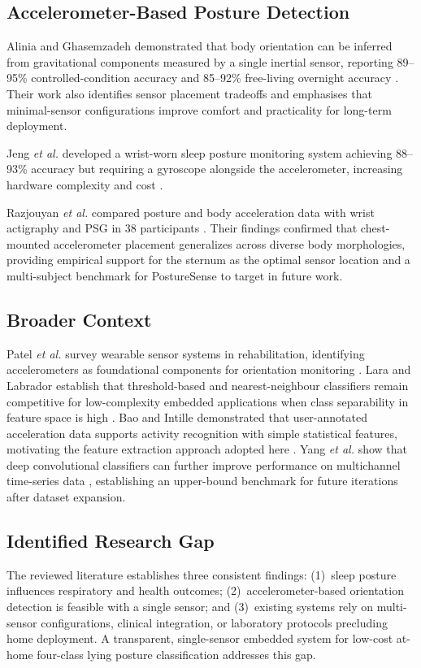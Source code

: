 \documentclass[journal]{IEEEtran}
\begin{document}
\subsection{Accelerometer-Based Posture Detection}
Alinia and Ghasemzadeh demonstrated that body orientation can be inferred
from gravitational components measured by a single inertial sensor,
reporting 89--95\% controlled-condition accuracy and 85--92\% free-living
overnight accuracy \cite{alinia2020}. Their work also identifies sensor
placement tradeoffs and emphasises that minimal-sensor configurations
improve comfort and practicality for long-term deployment.

Jeng \textit{et al.} developed a wrist-worn sleep posture monitoring system
achieving 88--93\% accuracy but requiring a gyroscope alongside the
accelerometer, increasing hardware complexity and cost \cite{jeng2021}.

Razjouyan \textit{et al.} compared posture and body acceleration data with
wrist actigraphy and PSG in 38 participants \cite{razjouyan2017}. Their
findings confirmed that chest-mounted accelerometer placement generalizes
across diverse body morphologies, providing empirical support for the
sternum as the optimal sensor location and a multi-subject benchmark for
PostureSense to target in future work.

\subsection{Broader Context}
Patel \textit{et al.} survey wearable sensor systems in rehabilitation,
identifying accelerometers as foundational components for orientation
monitoring \cite{patel2012}. Lara and Labrador establish that threshold-based
and nearest-neighbour classifiers remain competitive for low-complexity
embedded applications when class separability in feature space is high
\cite{lara2013}. Bao and Intille demonstrated that user-annotated
acceleration data supports activity recognition with simple statistical
features, motivating the feature extraction approach adopted here
\cite{bao2004}. Yang \textit{et al.} show that deep convolutional classifiers
can further improve performance on multichannel time-series data
\cite{yang2015}, establishing an upper-bound benchmark for future iterations
after dataset expansion.

\subsection{Identified Research Gap}
The reviewed literature establishes three consistent findings: (1)~sleep
posture influences respiratory and health outcomes; (2)~accelerometer-based
orientation detection is feasible with a single sensor; and (3)~existing
systems rely on multi-sensor configurations, clinical integration, or
laboratory protocols precluding home deployment. A transparent,
single-sensor embedded system for low-cost at-home four-class lying posture
classification addresses this gap.
\end{document}
